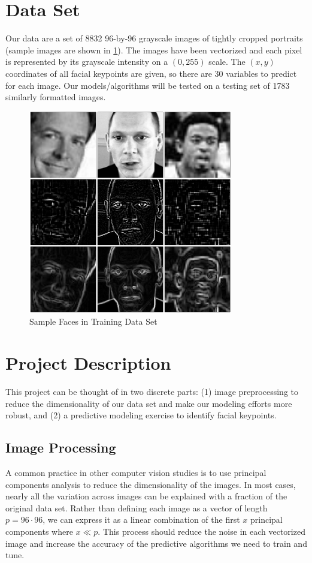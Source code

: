 \documentclass[conference]{IEEEtran}
\begin{document}
\section{Data Set}
Our data are a set of \num{8832} 96-by-96 grayscale images of tightly cropped portraits (sample images are shown in \cref{fig:sample_faces}). The images have been vectorized and each pixel is represented by its grayscale intensity on a $(0,255)$ scale. The $(x,y)$ coordinates of all facial keypoints are given, so there are 30 variables to predict for each image. Our models/algorithms will be tested on a testing set of \num{1783} similarly formatted images.
\begin{figure}[!ht]
\centering
\includegraphics[width=3.5in]{sample_faces.pdf}
\caption{Sample Faces in Training Data Set}
\label{fig:sample_faces}
\end{figure}

\section{Project Description}
This project can be thought of in two discrete parts: (1) image preprocessing to reduce the dimensionality of our data set and make our modeling efforts more robust, and (2) a predictive modeling exercise to identify facial keypoints.

\subsection{Image Processing}
A common practice in other computer vision studies is to use principal components analysis to reduce the dimensionality of the images. In most cases, nearly all the variation across images can be explained with a fraction of the original data set. Rather than defining each image as a vector of length $p=96\cdot96$, we can express it as a linear combination of the first $x$ principal components where $x \ll p$. This process should reduce the noise in each vectorized image and increase the accuracy of the predictive algorithms we need to train and tune.
\end{document}
